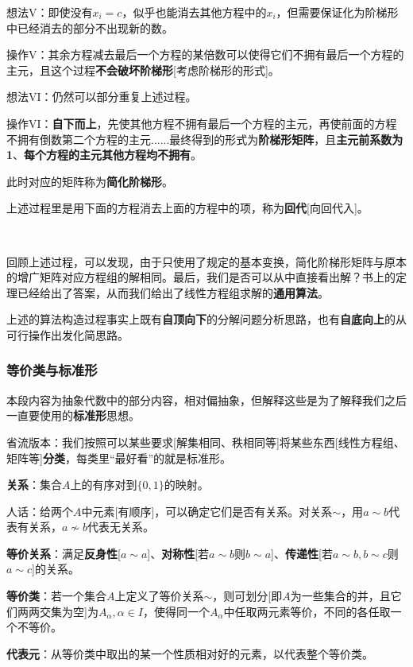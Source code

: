 \documentclass[a4paper,UTF8,fontset=windows]{ctexart}
\newcommand*{\note}{\noindent *}
\begin{document}
想法V：即使没有$x_i=c$，似乎也能消去其他方程中的$x_i$，但需要保证化为阶梯形中已经消去的部分不出现新的数。

操作V：其余方程减去最后一个方程的某倍数可以使得它们不拥有最后一个方程的主元，且这个过程\textbf{不会破坏阶梯形}[考虑阶梯形的形式]。

想法VI：仍然可以部分重复上述过程。

操作VI：\textbf{自下而上}，先使其他方程不拥有最后一个方程的主元，再使前面的方程不拥有倒数第二个方程的主元......最终得到的形式为\textbf{阶梯形矩阵}，且\textbf{主元前系数为1}、\textbf{每个方程的主元其他方程均不拥有}。

\note 此时对应的矩阵称为\textbf{简化阶梯形}。

\note 上述过程里是用下面的方程消去上面的方程中的项，称为\textbf{回代}[向回代入]。

\

回顾上述过程，可以发现，由于只使用了规定的基本变换，简化阶梯形矩阵与原本的增广矩阵对应方程组的解相同。最后，我们是否可以从中直接看出解？书上的定理已经给出了答案，从而我们给出了线性方程组求解的\textbf{通用算法}。

\note 上述的算法构造过程事实上既有\textbf{自顶向下}的分解问题分析思路，也有\textbf{自底向上}的从可行操作出发化简思路。

\subsubsection{等价类与标准形}
\note 本段内容为抽象代数中的部分内容，相对偏抽象，但解释这些是为了解释我们之后一直要使用的\textbf{标准形}思想。

\note 省流版本：我们按照可以某些要求[解集相同、秩相同等]将某些东西[线性方程组、矩阵等]\textbf{分类}，每类里``最好看''的就是标准形。

\textbf{关系}：集合$A$上的有序对到$\{0,1\}$的映射。

\note 人话：给两个$A$中元素[有顺序]，可以确定它们是否有关系。对关系$\sim$，用$a\sim b$代表有关系，$a\nsim b$代表无关系。

\textbf{等价关系}：满足\textbf{反身性}[$a\sim a$]、\textbf{对称性}[若$a\sim b$则$b\sim a$]、\textbf{传递性}[若$a\sim b,b\sim c$则$a\sim c$]的关系。

\textbf{等价类}：若一个集合$A$上定义了等价关系$\sim$，则可划分[即$A$为一些集合的并，且它们两两交集为空]为$A_\alpha,\alpha\in I$，使得同一个$A_\alpha$中任取两元素等价，不同的各任取一个不等价。

\textbf{代表元}：从等价类中取出的某一个性质相对好的元素，以代表整个等价类。
\end{document}
